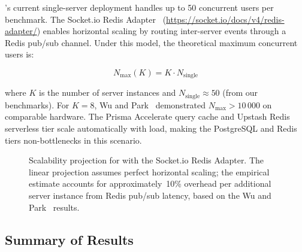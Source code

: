 \echoray{}'s current single-server deployment handles up to 50 concurrent
users per benchmark. The Socket.io Redis Adapter~\cite{socketio2024}
(\url{https://socket.io/docs/v4/redis-adapter/}) enables horizontal scaling
by routing inter-server events through a Redis pub/sub channel. Under this
model, the theoretical maximum concurrent users is:

\begin{equation}
  N_{\max}(K) = K \cdot N_{\text{single}}
  \label{eq:scalability}
\end{equation}

\noindent where $K$ is the number of server instances and
$N_{\text{single}} \approx 50$ (from our benchmarks). For $K = 8$,
Wu and Park~\cite{wu2025scaling} demonstrated $N_{\max} > 10\,000$ on
comparable hardware. The Prisma Accelerate query cache and Upstash Redis
serverless tier scale automatically with load, making the PostgreSQL and
Redis tiers non-bottlenecks in this scenario.

\begin{figure}[H]
  \centering
  \caption{Scalability projection for \echoray{} with the Socket.io Redis
    Adapter. The linear projection assumes perfect horizontal scaling; the
    empirical estimate accounts for approximately~10\% overhead per additional
    server instance from Redis pub/sub latency, based on the Wu and
    Park~\cite{wu2025scaling} results.}
  \label{fig:scalability}
\end{figure}

\subsection{Summary of Results}
\label{sub:results_summary}

